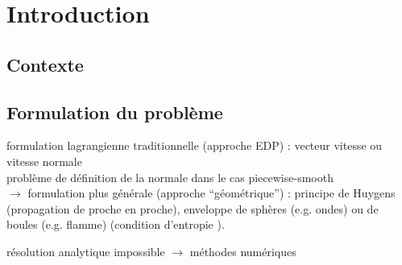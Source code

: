 \def\chapterabstract{}
\chapter*{Introduction}

\section*{Contexte}%


\section*{Formulation du problème}%
formulation lagrangienne traditionnelle (approche EDP) : vecteur vitesse 
ou vitesse normale 
\\
problème de définition de la normale dans le cas piecewise-smooth\\
$\to$ formulation plus générale (approche ``géométrique'') : principe de Huygens (propagation de proche en proche), enveloppe de sphères (e.g. ondes) ou de boules (e.g. flamme) (condition d'entropie \cite{sethian1999}).
\par
résolution analytique impossible $\to$ méthodes numériques
